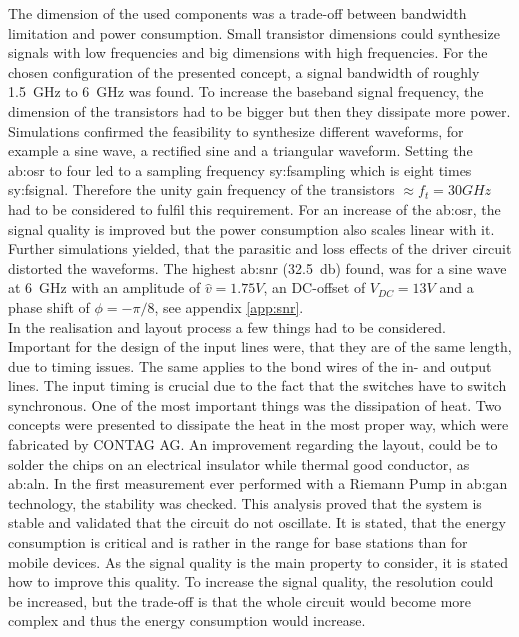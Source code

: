 The dimension of the used components was a trade-off between bandwidth limitation and power consumption.
Small transistor dimensions could synthesize signals with low frequencies and big dimensions with high frequencies.
For the chosen configuration of the presented concept, a signal bandwidth of roughly \SI{1.5}{\GHz} to \SI{6}{\GHz} was found.
To increase the baseband signal frequency, the dimension of the transistors had to be bigger but then they dissipate more power. \\
Simulations confirmed the feasibility to synthesize different waveforms, for example a sine wave, a rectified sine and a triangular waveform.
Setting the \gls{ab:osr} to four led to a sampling frequency \gls{sy:fsampling} which is eight times \gls{sy:fsignal}.
Therefore the unity gain frequency of the transistors $\approx f_{t} = 30 GHz$ had to be considered to fulfil this requirement.
For an increase of the \gls{ab:osr}, the signal quality is improved but the power consumption also scales linear with it.\\
Further simulations yielded, that the parasitic and loss effects of the driver circuit distorted the waveforms.
The highest \gls{ab:snr} (\SI{32.5}{\decibel}) found, was for a sine wave at \SI{6}{\giga \hertz} with an amplitude of $\hat{v} = 1.75 V$, an DC-offset of $V_{DC} = 13 V$ and a phase shift of $\phi = -\pi/8$, see appendix \ref{app:snr}.\\
In the realisation and layout process a few things had to be considered.
Important for the design of the input lines were, that they are of the same length, due to timing issues.
The same applies to the bond wires of the in- and output lines.
The input timing is crucial due to the fact that the switches have to switch synchronous.
One of the most important things was the dissipation of heat.
Two concepts were presented to dissipate the heat in the most proper way, which were fabricated by CONTAG AG.
An improvement regarding the layout, could be to solder the chips on an electrical insulator while thermal good conductor, as \gls{ab:aln}.
In the first measurement ever performed with a Riemann Pump in \gls{ab:gan} technology, the stability was checked.
This analysis proved that the system is stable and validated that the circuit do not oscillate.
It is stated, that the energy consumption is critical and is rather in the range for base stations than for mobile devices.
As the signal quality is the main property to consider, it is stated how to improve this quality.
To increase the signal quality, the resolution could be increased, but the trade-off is that the whole circuit would become more complex and thus the energy consumption would increase.
